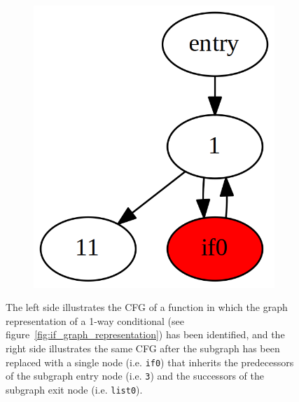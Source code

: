\begin{figure}[htbp]
\begin{subfigure}[ht]{0.15\textwidth}
		\includegraphics[width=\textwidth]{inc/2_lit_review/cfg_post_merge.png}
	\end{subfigure}
	\caption{The left side illustrates the CFG of a function in which the graph representation of a 1-way conditional (see figure~\ref{fig:if_graph_representation}) has been identified, and the right side illustrates the same CFG after the subgraph has been replaced with a single node (i.e. \texttt{if0}) that inherits the predecessors of the subgraph entry node (i.e. \texttt{3}) and the successors of the subgraph exit node (i.e. \texttt{list0}).}
	\label{fig:subgraph_merge}
\end{figure}

